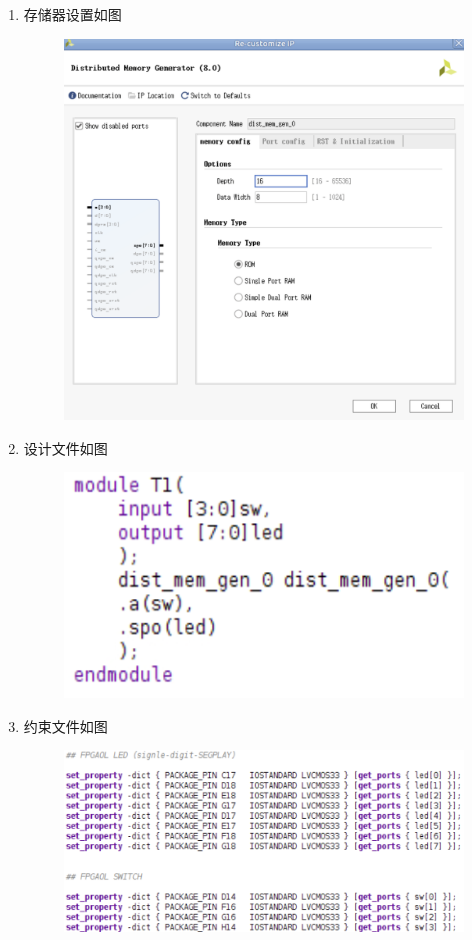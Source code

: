 \documentclass{article}
\begin{document}
\begin{enumerate}
        \item []存储器设置如图
        \begin{figure}[htbp]
            \centering
            \includegraphics[scale=0.6]{ip1.png}
        \end{figure}
        \clearpage
        \item []设计文件如图
        \begin{figure}[htbp]
            \centering
            \includegraphics[scale=0.8]{v1.png}
        \end{figure}

        \item []约束文件如图
        \begin{figure}[htbp]
            \centering
            \includegraphics[scale=0.6]{x1.png}
        \end{figure}
        

\end{enumerate}
\end{document}
